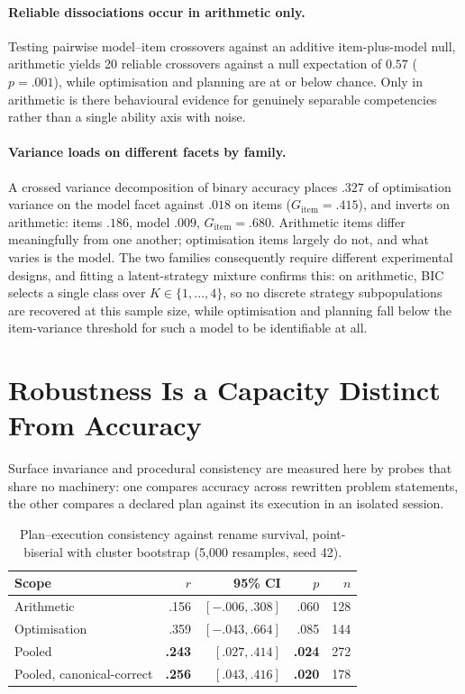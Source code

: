\documentclass{article}
\begin{document}
\paragraph{Reliable dissociations occur in arithmetic only.} Testing pairwise
model--item crossovers against an additive item-plus-model null, arithmetic yields
20 reliable crossovers against a null expectation of $0.57$ ($p = .001$), while
optimisation and planning are at or below chance. Only in arithmetic is there
behavioural evidence for genuinely separable competencies rather than a single
ability axis with noise.

\paragraph{Variance loads on different facets by family.} A crossed variance
decomposition of binary accuracy places $.327$ of optimisation variance on the model
facet against $.018$ on items ($G_{\mathrm{item}} = .415$), and inverts on
arithmetic: items $.186$, model $.009$, $G_{\mathrm{item}} = .680$. Arithmetic items
differ meaningfully from one another; optimisation items largely do not, and what
varies is the model. The two families consequently require different experimental
designs, and fitting a latent-strategy mixture confirms this: on arithmetic, BIC
selects a single class over $K \in \{1,\dots,4\}$, so no discrete strategy
subpopulations are recovered at this sample size, while optimisation and planning
fall below the item-variance threshold for such a model to be identifiable at all.

\section{Robustness Is a Capacity Distinct From Accuracy}

Surface invariance and procedural consistency are measured here by probes that share
no machinery: one compares accuracy across rewritten problem statements, the other
compares a declared plan against its execution in an isolated session.

\begin{table}[t]
\centering
\caption{Plan--execution consistency against rename survival, point-biserial with
cluster bootstrap (5{,}000 resamples, seed 42).}
\label{tab:convergence}
\small
\begin{tabular}{lrrrr}
\toprule
Scope & $r$ & 95\% CI & $p$ & $n$ \\
\midrule
Arithmetic & .156 & $[-.006, .308]$ & .060 & 128 \\
Optimisation & .359 & $[-.043, .664]$ & .085 & 144 \\
Pooled & \textbf{.243} & $[.027, .414]$ & \textbf{.024} & 272 \\
Pooled, canonical-correct & \textbf{.256} & $[.043, .416]$ & \textbf{.020} & 178 \\
\bottomrule
\end{tabular}
\end{table}
\end{document}

